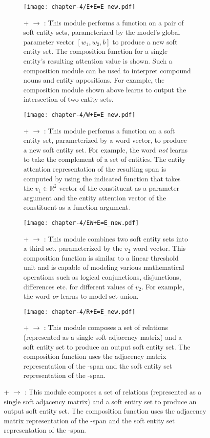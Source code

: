 \begin{figure}[h!]
  \captionsetup[subfigure]{labelformat=empty}
  \begin{subfigure}[t]{.48\textwidth}
    \centering
    \texttt{[image: chapter-4/E+E=E\_new.pdf]}
    \caption{\label{fig:eee} \scriptsize{ +  $\rightarrow$ : This module performs a function on a pair of soft entity sets, parameterized by the model's global parameter vector $[w_{1}, w_{2}, b]$ to produce a new soft entity set. The composition function for a single entity's resulting attention value is shown. Such a composition module can be used to interpret compound nouns and entity appositions. For example, the composition module shown above learns to output the intersection of two entity sets.}}
  \end{subfigure}
  \hfill
  \begin{subfigure}[t]{.48\textwidth}
    \centering
    \texttt{[image: chapter-4/W+E=E\_new.pdf]}
    \caption{\label{fig:wee}\scriptsize{ +  $\rightarrow$ : This module performs a function on a soft entity set, parameterized by a word vector, to produce a new soft entity set. For example, the word \emph{not} learns to take the complement of a set of entities. The entity attention representation of the resulting span is computed by using the indicated function that takes the $v_{1} \in \mathbb{R}^{2}$ vector of the  constituent as a          parameter argument and the entity attention vector of the  constituent as a function argument.}}
  \end{subfigure}

    \smallskip

  \begin{subfigure}[t]{.48\textwidth}
    \centering
    \texttt{[image: chapter-4/EW+E=E\_new.pdf]}
    \caption{\label{fig:ewee} \scriptsize{ +  $\rightarrow$ : This module combines two soft entity sets into a third set, parameterized by the $v_{2}$ word vector. This composition function is similar to a linear threshold unit and is capable of modeling various mathematical operations such as logical conjunctions, disjunctions, differences etc. for different values of $v_{2}$. For example, the word \emph{or} learns to model set union.}}
  \end{subfigure}
  \hfill
  \begin{subfigure}[t]{.48\textwidth}
    \centering
    \texttt{[image: chapter-4/R+E=E\_new.pdf]}
    \caption{\label{fig:ree}\scriptsize{ +  $\rightarrow$ : This module composes a set of relations (represented as a single soft adjacency matrix) and a soft entity set to produce an output soft entity set. The composition function uses the adjacency matrix representation of the -span and the soft entity set representation of the -span. }}
  \end{subfigure}


\end{figure}
